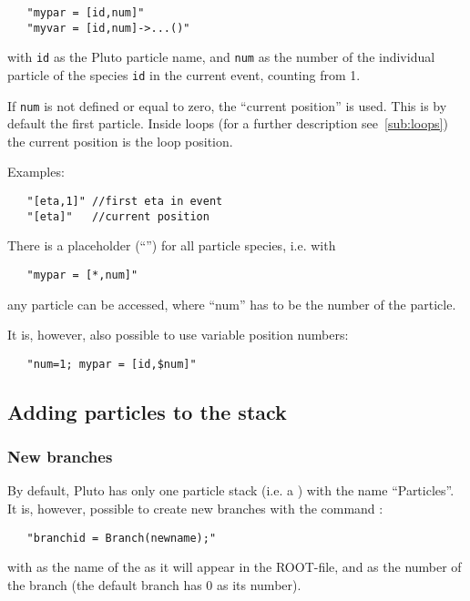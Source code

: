 {\begin{verbatim}
   "mypar = [id,num]"
   "myvar = [id,num]->...()"
\end{verbatim}

with {\tt id} as the Pluto particle name, and {\tt num} as the number
of the individual particle of the species {\tt id} in the current event,
counting from 1.

If {\tt num} is not defined or equal to zero, the ``current position''
is used. This is by default the first particle. Inside loops
(for a further description see~\ref{sub:loops}) the current position is the loop position.

Examples:
\begin{verbatim}
   "[eta,1]" //first eta in event
   "[eta]"   //current position
\end{verbatim}

There is a placeholder (``\s{*}'') for all particle species, i.e. with

\begin{verbatim}
   "mypar = [*,num]"
\end{verbatim}

any particle can be accessed, where ``num'' has to be the number of the particle.

It is, however, also possible to use variable position numbers:

\begin{verbatim}
   "num=1; mypar = [id,$num]"
\end{verbatim}



\subsection{Adding particles to the stack}\label{sub:push}

\subsubsection{New branches}

By default, Pluto has only one particle stack (i.e. a ) with
the name ``Particles''. It is, however, possible to create new
branches with the command :

\begin{verbatim}
   "branchid = Branch(newname);"
\end{verbatim}

with  as the name of the  as it will appear in
the ROOT-file, and  as the number of the branch (the default branch
has 0 as its number).

}
